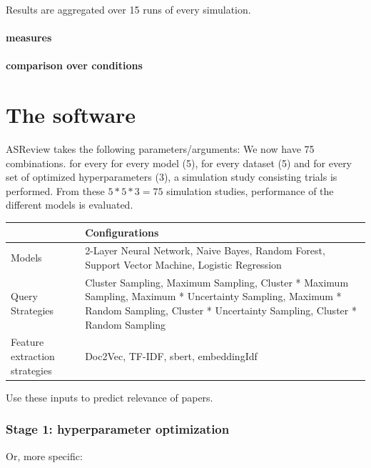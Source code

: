 \documentclass[
]{article}
\begin{document}
Results are aggregated over 15 runs of every simulation.

\hypertarget{measures}{%
\paragraph{measures}\label{measures}}

\hypertarget{comparison-over-conditions}{%
\paragraph{comparison over
conditions}\label{comparison-over-conditions}}

\hypertarget{the-software}{%
\section{The software}\label{the-software}}

ASReview takes the following parameters/arguments: We now have 75
combinations. for every for every model (5), for every dataset (5) and
for every set of optimized hyperparameters (3), a simulation study
consisting trials is performed. From these \(5*5*3=75\) simulation
studies, performance of the different models is evaluated.

\begin{tabu} to 
\toprule
  & Configurations\\
\midrule
Models & 2-Layer Neural Network, Naive Bayes, Random Forest, Support Vector Machine, Logistic Regression\\
Query Strategies & Cluster Sampling, Maximum Sampling, Cluster * Maximum  Sampling, Maximum * Uncertainty Sampling, Maximum * Random Sampling, Cluster * Uncertainty Sampling, Cluster * Random Sampling\\
Feature extraction strategies & Doc2Vec, TF-IDF, sbert, embeddingIdf\\
\bottomrule
\end{tabu}

Use these inputs to predict relevance of papers.

\hypertarget{stage-1-hyperparameter-optimization}{%
\subsubsection{Stage 1: hyperparameter
optimization}\label{stage-1-hyperparameter-optimization}}

Or, more specific:
\end{document}
